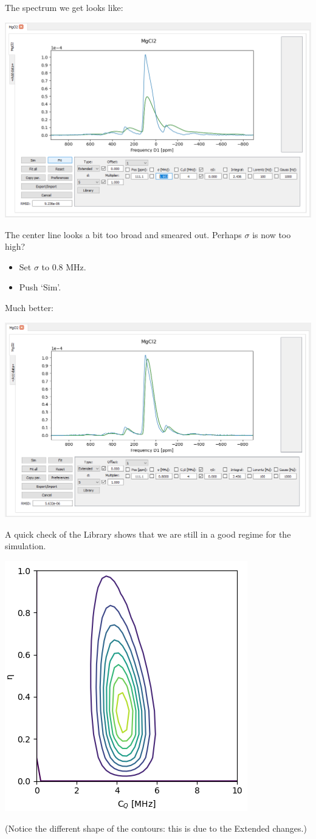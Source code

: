 \documentclass[11pt,a4paper]{article}
\begin{document}
The spectrum we get looks like:
\begin{center}
\includegraphics[width=0.8\linewidth]{Figs/fig9.PNG}
\end{center}
The center line looks a bit too broad and smeared out. Perhaps $\sigma$ is now too high?
\begin{itemize}
  \item Set $\sigma$ to 0.8 MHz.
  \item Push `Sim'.
\end{itemize}
Much better:
\begin{center}
\includegraphics[width=0.8\linewidth]{Figs/fig10.PNG}
\end{center}
A quick check of the Library shows that we are still in a good regime for the simulation.
\begin{center}
\includegraphics[width=0.5\linewidth]{Figs/fig11.PNG}
\end{center}
(Notice the different shape of the contours: this is due to the Extended changes.)
\end{document}
